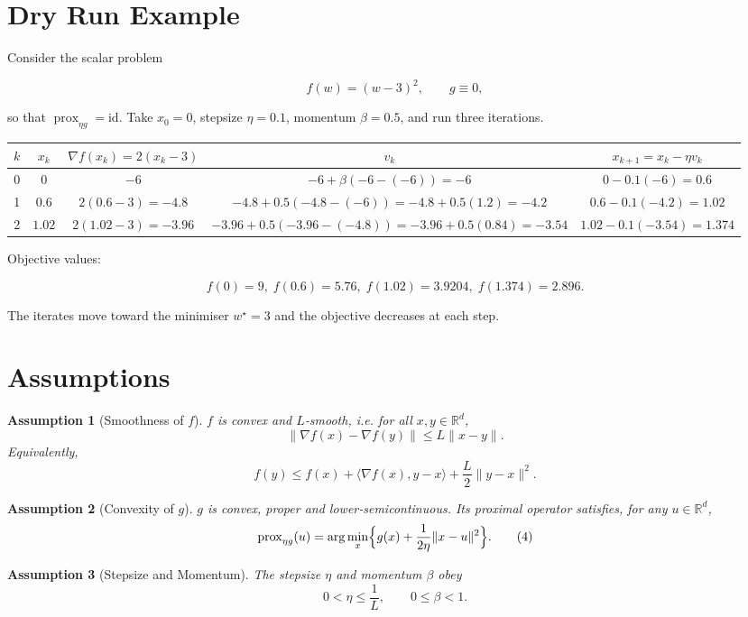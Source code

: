 \documentclass{article}
\newtheorem{assumption}{Assumption}
\newcommand{\prox}{\operatorname{prox}}
\begin{document}
\section*{Dry Run Example}
Consider the scalar problem  

\[
f(w) = (w-3)^2,\qquad g\equiv0,
\]

so that $\prox_{\eta g}= \mathrm{id}$.  
Take $x_0=0$, stepsize $\eta=0.1$, momentum $\beta=0.5$, and run three iterations.

\begin{center}
\begin{tabular}{c|c|c|c|c}
$k$ & $x_k$ & $\nabla f(x_k)=2(x_k-3)$ & $v_k$ & $x_{k+1}=x_k-\eta v_k$ \\ \hline
0 & $0$ & $-6$ & $-6+\beta(-6-(-6))=-6$ & $0-0.1(-6)=0.6$ \\[1ex]
1 & $0.6$ & $2(0.6-3)=-4.8$ & $-4.8+0.5(-4.8-(-6))=-4.8+0.5(1.2)=-4.2$ &
$0.6-0.1(-4.2)=1.02$ \\[1ex]
2 & $1.02$ & $2(1.02-3)=-3.96$ & $-3.96+0.5(-3.96-(-4.8))=-3.96+0.5(0.84)=-3.54$ &
$1.02-0.1(-3.54)=1.374$ 
\end{tabular}
\end{center}

Objective values:  

\[
f(0)=9,\; f(0.6)=5.76,\; f(1.02)=3.9204,\; f(1.374)=2.896.
\]

The iterates move toward the minimiser $w^\star=3$ and the objective decreases at each step.

\newpage
\section*{Assumptions}
\begin{assumption}[Smoothness of $f$]\label{as:smooth}
$f$ is convex and $L$‑smooth, i.e. for all $x,y\in\mathbb{R}^d$,
\[
\|\nabla f(x)-\nabla f(y)\|\le L\|x-y\|.
\tag{2}
\]
Equivalently,
\[
f(y)\le f(x)+\langle \nabla f(x),y-x\rangle+\frac{L}{2}\|y-x\|^2 .
\tag{3}
\]
\end{assumption}

\begin{assumption}[Convexity of $g$]\label{as:convex}
$g$ is convex, proper and lower‑semicontinuous. Its proximal operator satisfies, for any $u\in\mathbb{R}^d$,
\[
\prox_{\eta g}(u)=\arg\min_{x}\Bigl\{ g(x)+\frac{1}{2\eta}\|x-u\|^2\Bigr\}.
\tag{4}
\]
\end{assumption}

\begin{assumption}[Stepsize and Momentum]\label{as:params}
The stepsize $\eta$ and momentum $\beta$ obey
\[
0<\eta\le \frac{1}{L},\qquad 0\le\beta<1.
\tag{5}
\]
\end{assumption}
\end{document}

